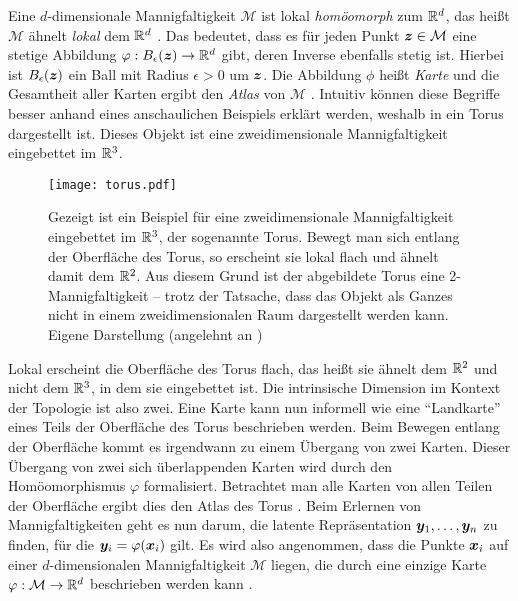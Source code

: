 Eine $d$-dimensionale Mannigfaltigkeit $\mathcal{M}$ ist lokal \textit{homöomorph} zum $\mathbb{R}^d$,
das heißt $\mathcal{M}$ ähnelt \textit{lokal} dem $\mathbb{R}^d$ \parencite[3]{Lee.2011}. Das bedeutet, dass es für jeden Punkt $\bm{z} \in \mathcal{M}$ eine stetige
Abbildung $\varphi: B_\epsilon(\bm{z}) \rightarrow \mathbb{R}^d$ gibt, deren Inverse ebenfalls stetig
ist. Hierbei ist $B_\epsilon(\bm{z})$ ein Ball mit Radius $\epsilon > 0$ um $\bm{z}$. Die
Abbildung $\phi$ heißt \textit{Karte} und die Gesamtheit aller Karten ergibt den \textit{Atlas} von
$\mathcal{M}$ \parencite[4]{Cayton.2005}. Intuitiv können diese Begriffe besser anhand eines anschaulichen Beispiels
erklärt werden, weshalb in  ein Torus dargestellt ist. Dieses Objekt ist eine
zweidimensionale Mannigfaltigkeit eingebettet im $\mathbb{R}^3$.
\begin{figure}[ht]
	\centering
	\texttt{[image: torus.pdf]}
	\caption[Ein Beispiel für eine zweidimensionale Mannigfaltigkeit: ein Torus]{Gezeigt ist ein Beispiel für eine zweidimensionale Mannigfaltigkeit eingebettet im $\mathbb{R}^3$, der sogenannte Torus. Bewegt man sich entlang der Oberfläche des Torus, so erscheint sie lokal flach und ähnelt damit dem $\mathbb{R}^2$. Aus diesem Grund ist der abgebildete Torus eine 2-Mannigfaltigkeit -- trotz der Tatsache, dass das Objekt als Ganzes nicht in einem zweidimensionalen Raum dargestellt werden kann. Eigene Darstellung (angelehnt an \textcite[350]{Hill.2020})}
	\label{fig:Torus}
\end{figure}
Lokal erscheint die Oberfläche des Torus flach, das heißt sie ähnelt dem $\mathbb{R}^2$ und nicht dem $\mathbb{R}^3$, in dem sie eingebettet ist. Die intrinsische Dimension im Kontext der Topologie ist also zwei. Eine Karte kann nun informell wie eine \enquote{Landkarte} eines Teils der Oberfläche des Torus beschrieben werden. Beim Bewegen entlang der Oberfläche kommt es irgendwann zu einem Übergang von zwei Karten. Dieser Übergang von zwei sich
überlappenden Karten wird durch den Homöomorphismus $\varphi$ formalisiert. Betrachtet man alle Karten
von allen Teilen der Oberfläche ergibt dies den Atlas des Torus \parencite[4, 12]{Lee.2012}. Beim Erlernen von Mannigfaltigkeiten geht es nun darum, die latente
Repräsentation $\bm{y}_1, \ldots, \bm{y}_n$ zu finden, für die $\bm{y}_i =
	\varphi(\bm{x}_i)$ gilt. Es wird also angenommen, dass die Punkte $\bm{x}_i$ auf einer
$d$-dimensionalen Mannigfaltigkeit $\mathcal{M}$ liegen, die durch eine einzige Karte $\varphi:
	\mathcal{M} \rightarrow \mathbb{R}^d$ beschrieben werden kann \parencite[4]{Cayton.2005}.


